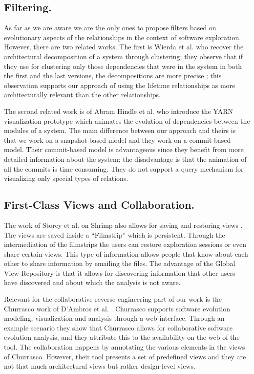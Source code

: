 \documentclass[preprint,12pt]{elsarticle}
\begin{document}
\subsection {Filtering.} 

As far as we are aware we are the only ones to propose filters based on evolutionary aspects of the relationships in the context of software exploration. However, there are two related works. The first is Wierda et al. who recover the architectural decomposition of a system through clustering; they observe that if they use for clustering only those dependencies that were in the system in both the first and the last versions, the decompositions are more precise \cite{wierda-clustering}; this observation supports our approach of using the lifetime relationships as more architecturally relevant than the other relationships. 

The second related work is of Abram Hindle et al. \cite{hindle-yarn} who introduce the YARN visualization prototype which animates the evolution of dependencies between the modules of a system. The main difference between our approach and theirs is that we work on a snapshot-based model and they work on a commit-based model. Their commit-based model is advantageous since they benefit from more detailed information about the system; the disadvantage is that the animation of all the commits is time consuming. They do not support a query mechanism for visualizing only special types of relations.


\subsection {First-Class Views and Collaboration.} The work of Storey et al. on Shrimp also allows for saving and restoring views \cite{rayside-flow}. The views are saved inside a ``Filmstrip'' which is persistent. Through the intermediation of the filmstrips the users can restore exploration sessions or even share certain views. This type of information allows people that know about each other to share information by emailing the files. The advantage of the Global View Repository is that it allows for discovering information that other users have discovered and about which the analysis is not aware. 


Relevant for the collaborative reverse engineering part of our work is the Churrasco work of D’Ambros et al. \cite{dambros-churrasco}. Churrasco supports software evolution modeling, visualization and analysis through a web interface. 
Through an example scenario they show that Churrasco allows for collaborative software evolution analysis, and they attribute this to the availability on the web of the tool. The collaboration happens by annotating the various elements in the views of Churrasco. However, their tool presents a set of predefined views and they are not that much architectural views but rather design-level views. 
\end{document}
